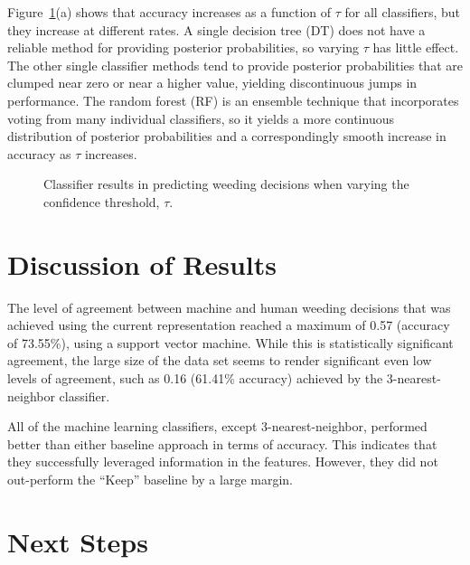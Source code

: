 \documentclass[man,11pt]{apa6}
\begin{document}
Figure~\ref{fig:res}(a) shows that accuracy increases as a function of
$\tau$ for all classifiers, but they increase at different rates.  A
single decision tree (DT) does not have a reliable method for
providing posterior probabilities, so varying $\tau$ has little
effect.  The other single classifier methods tend to provide posterior
probabilities that are clumped near zero or near a higher value,
yielding discontinuous jumps in performance.  The random forest (RF)
is an ensemble technique that incorporates voting from many individual
classifiers, so it yields a more continuous distribution of posterior
probabilities and a correspondingly smooth increase in accuracy as
$\tau$ increases.

\begin{figure}
\centering
{}
\caption{Classifier results in predicting weeding decisions when
  varying the confidence threshold, $\tau$.}
\label{fig:res}
\end{figure}


\section{Discussion of Results}

The level of agreement between machine and human weeding decisions
that was achieved using the current representation reached a maximum
of 0.57 (accuracy of 73.55\%), using a support vector machine.  While
this is statistically significant agreement, the large size of the
data set seems to render significant even low levels of agreement,
such as 0.16 (61.41\% accuracy) achieved by the 3-nearest-neighbor
classifier.  

All of the machine learning classifiers, except 3-nearest-neighbor,
performed better than either baseline approach in terms of accuracy.
This indicates that they successfully leveraged information in the
features.  However, they did not out-perform the ``Keep'' baseline by
a large margin.

\section{Next Steps}
\end{document}
